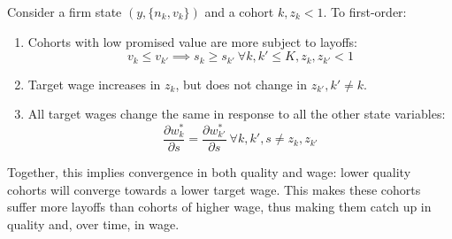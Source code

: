 \begin{proposition} \label{prop:qualityconv}
 Consider a firm state $(y,\{n_k,v_k\})$ and a cohort $k, z_k<1$. To first-order:
  \begin{enumerate}
    \item Cohorts with low promised value are more subject to layoffs: 
    \[ v_k \leq v_{k'} \implies s_k \geq s_{k'} \: \forall k,k'\leq K, z_k,z_{k'}<1\]
    \item Target wage increases in $z_k$, but does not change in $z_{k'},k'\neq k$.
    \item All target wages change the same in response to all the other state variables:
    \[\frac{\partial w^*_k}{\partial s} = \frac{\partial w^*_{k'}}{\partial s}\:  \forall k,k', s\neq z_k,z_{k'}\]
  \end{enumerate}
\end{proposition}
Together, this implies convergence in both quality and wage: lower quality cohorts will converge towards a lower target wage. This makes these cohorts suffer more layoffs than cohorts of higher wage, thus making them catch up in quality and, over time, in wage. 

